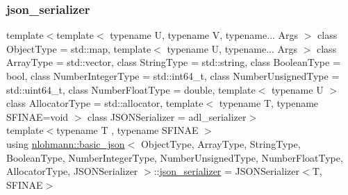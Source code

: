 \subsubsection{\texorpdfstring{json\_serializer}{json\_serializer}}
{\footnotesize\ttfamily template$<$template$<$ typename U, typename V, typename... Args $>$ class Object\+Type = std\+::map, template$<$ typename U, typename... Args $>$ class Array\+Type = std\+::vector, class String\+Type  = std\+::string, class Boolean\+Type  = bool, class Number\+Integer\+Type  = std\+::int64\+\_\+t, class Number\+Unsigned\+Type  = std\+::uint64\+\_\+t, class Number\+Float\+Type  = double, template$<$ typename U $>$ class Allocator\+Type = std\+::allocator, template$<$ typename T, typename S\+F\+I\+N\+A\+E=void $>$ class J\+S\+O\+N\+Serializer = adl\+\_\+serializer$>$ \\
template$<$typename T , typename S\+F\+I\+N\+AE $>$ \\
using \mbox{\hyperlink{classnlohmann_1_1basic__json}{nlohmann\+::basic\+\_\+json}}$<$ Object\+Type, Array\+Type, String\+Type, Boolean\+Type, Number\+Integer\+Type, Number\+Unsigned\+Type, Number\+Float\+Type, Allocator\+Type, J\+S\+O\+N\+Serializer $>$\+::\mbox{\hyperlink{classnlohmann_1_1basic__json_a7768841baaaa7a21098a401c932efaff}{json\+\_\+serializer}} =  J\+S\+O\+N\+Serializer$<$T, S\+F\+I\+N\+AE$>$}

\mbox{\label{classnlohmann_1_1basic__json_a88d6103cb3620410b35200ee8e313d97}} 
